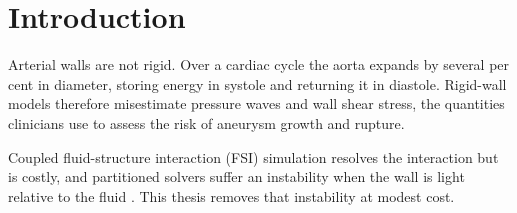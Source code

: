 \chapter{Introduction}
\label{ch:introduction}

Arterial walls are not rigid. Over a cardiac cycle the aorta expands by several per cent in
diameter, storing energy in systole and returning it in diastole. Rigid-wall models therefore
misestimate pressure waves and wall shear stress, the quantities clinicians use to assess the
risk of aneurysm growth and rupture.

Coupled fluid-structure interaction (FSI) simulation resolves the interaction but is costly,
and partitioned solvers suffer an instability when the wall is light relative to the fluid
\citep{causin2005}. This thesis removes that instability at modest cost.
